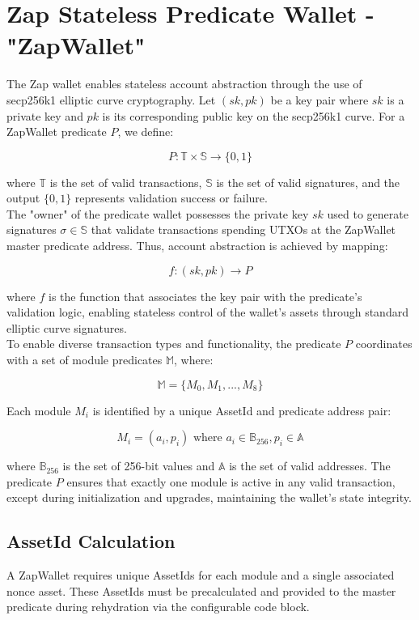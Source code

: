 \newpage
\section{Zap Stateless Predicate Wallet - {\ttfamily "ZapWallet"}}
\label{sec:predi_wal}

The Zap wallet enables stateless account abstraction through the use of secp256k1 elliptic curve cryptography. Let $(sk, pk)$ be a key
pair where $sk$ is a private key and $pk$ is its corresponding public key on the secp256k1 curve. For a ZapWallet predicate $P$, we define:

\[ P: \mathbb{T} \times \mathbb{S} \rightarrow \{0,1\} \]

where $\mathbb{T}$ is the set of valid transactions, $\mathbb{S}$ is the set of valid signatures, and the output $\{0,1\}$ represents
validation success or failure.\\

The "owner" of the predicate wallet possesses the private key $sk$ used to generate signatures $\sigma \in \mathbb{S}$ that validate
transactions spending UTXOs at the ZapWallet master predicate address. Thus, account abstraction is achieved by mapping:

\[ f: (sk, pk) \rightarrow P \]

where $f$ is the function that associates the key pair with the predicate's validation logic, enabling stateless control of the
wallet's assets through standard elliptic curve signatures.\\

To enable diverse transaction types and functionality, the predicate $P$ coordinates with a set of module predicates $\mathbb{M}$, where:

\[ \mathbb{M} = \{M_0, M_1, ..., M_8\} \]

Each module $M_i$ is identified by a unique AssetId and predicate address pair:

\[ M_i = (a_i, p_i) \text{ where } a_i \in \mathbb{B}_{256}, p_i \in \mathbb{A} \]

where $\mathbb{B}_{256}$ is the set of 256-bit values and $\mathbb{A}$ is the set of valid addresses. The predicate $P$ ensures that
exactly one module is active in any valid transaction, except during initialization and upgrades, maintaining the wallet's state integrity.







\subsection{AssetId Calculation}
A ZapWallet requires unique AssetIds for each module and a single associated nonce asset. These AssetIds must be precalculated
and provided to the master predicate during rehydration via the configurable code block.

